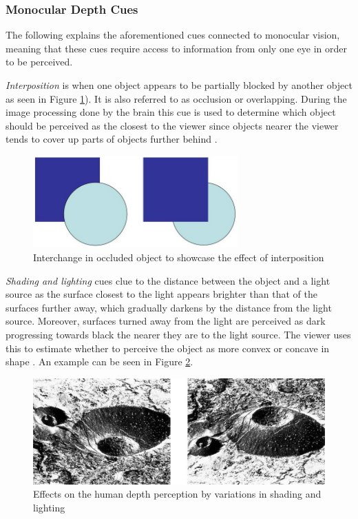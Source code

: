 \subsubsection{Monocular Depth Cues}
The following explains the aforementioned cues connected to monocular vision, meaning that these cues require access to information from only one eye in order to be perceived.

\textit{Interposition} is when one object appears to be partially blocked by another object as seen in Figure \ref{fig:cue0}). It is also referred to as occlusion or overlapping. During the image processing done by the brain this cue is used to determine which object should be perceived as the closest to the viewer since objects nearer the viewer tends to cover up parts of objects further behind \cite{Gale}.

\begin{figure}[h!]
   \centering
   \includegraphics[width=0.7\textwidth]{figures/cue0.jpg}
   \caption{Interchange in occluded object to showcase the effect of interposition \cite{Heeger}}\label{fig:cue0}
\end{figure}

\textit{Shading and lighting} cues clue to the distance between the object and a light source as the surface closest to the light appears brighter than that of the surfaces further away, which gradually darkens by the distance from the light source. Moreover, surfaces turned away from the light are perceived as dark progressing towards black the nearer they are to the light source. The viewer uses this to estimate whether to perceive the object as more convex or concave in shape \cite{Gale}. An example can be seen in Figure \ref{fig:cue1}.\pagebreak

\begin{figure}[h!]
   \centering
   \includegraphics[width=\textwidth]{figures/cue1.jpg}
   \caption{Effects on the human depth perception by variations in shading and lighting \cite{Heeger}}\label{fig:cue1}
\end{figure}

